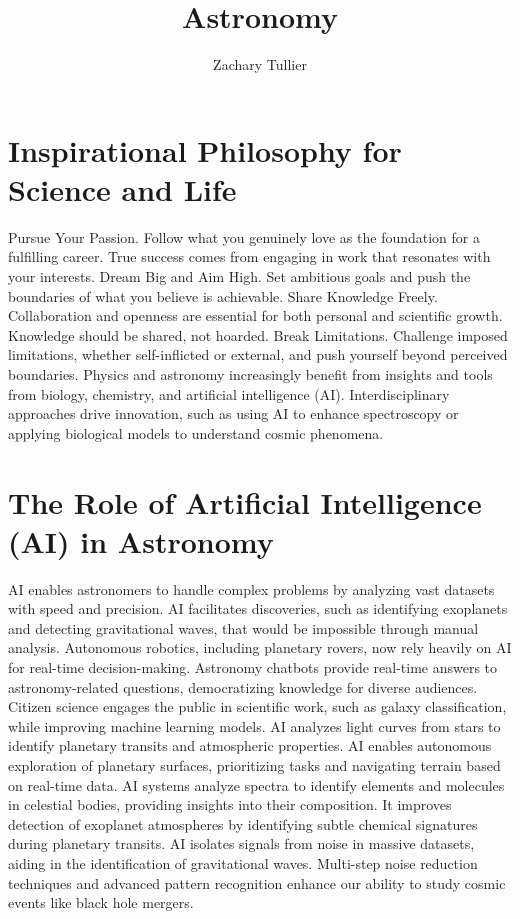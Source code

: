 \documentclass[12pt]{article}
\begin{document}
\singlespacing  %
\title{Astronomy}

\author[1]{Zachary Tullier}
\date{}
\maketitle




\section{Inspirational Philosophy for Science and Life}
    Pursue Your Passion. Follow what you genuinely love as the foundation for a fulfilling career. True success comes from engaging in work that resonates with your interests. Dream Big and Aim High. Set ambitious goals and push the boundaries of what you believe is achievable. Share Knowledge Freely. Collaboration and openness are essential for both personal and scientific growth. Knowledge should be shared, not hoarded. Break Limitations. Challenge imposed limitations, whether self-inflicted or external, and push yourself beyond perceived boundaries. Physics and astronomy increasingly benefit from insights and tools from biology, chemistry, and artificial intelligence (AI). Interdisciplinary approaches drive innovation, such as using AI to enhance spectroscopy or applying biological models to understand cosmic phenomena.


\section{The Role of Artificial Intelligence (AI) in Astronomy}
    AI enables astronomers to handle complex problems by analyzing vast datasets with speed and precision. AI facilitates discoveries, such as identifying exoplanets and detecting gravitational waves, that would be impossible through manual analysis. Autonomous robotics, including planetary rovers, now rely heavily on AI for real-time decision-making. Astronomy chatbots provide real-time answers to astronomy-related questions, democratizing knowledge for diverse audiences. Citizen science engages the public in scientific work, such as galaxy classification, while improving machine learning models. AI analyzes light curves from stars to identify planetary transits and atmospheric properties. AI enables autonomous exploration of planetary surfaces, prioritizing tasks and navigating terrain based on real-time data. AI systems analyze spectra to identify elements and molecules in celestial bodies, providing insights into their composition. It improves detection of exoplanet atmospheres by identifying subtle chemical signatures during planetary transits. AI isolates signals from noise in massive datasets, aiding in the identification of gravitational waves. Multi-step noise reduction techniques and advanced pattern recognition enhance our ability to study cosmic events like black hole mergers.
\end{document}
